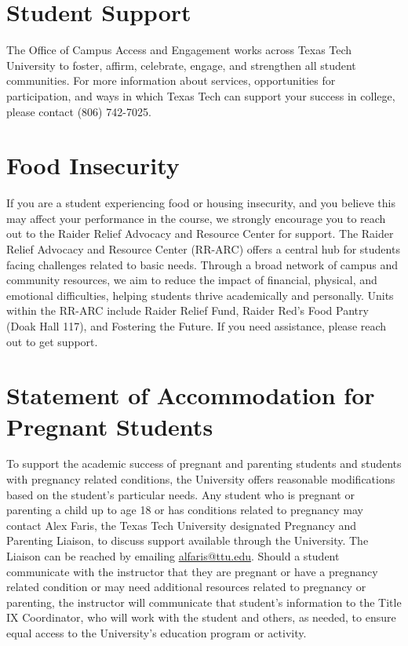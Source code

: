 \documentclass[12pt, notitlepage]{article}   	%
\begin{document}
{\section{Student Support}
The Office of Campus Access and Engagement works across Texas Tech University to foster, affirm, celebrate, engage, and strengthen all student communities. For more information about services, opportunities for participation, and ways in which Texas Tech can support your success in college, please contact (806) 742-7025.

\section{Food Insecurity}
If you are a student experiencing food or housing insecurity, and you believe this may affect your performance in the course, we strongly encourage you to reach out to the Raider Relief Advocacy and Resource Center for support. The Raider Relief Advocacy and Resource Center (RR-ARC) offers a central hub for students facing challenges related to basic needs. Through a broad network of campus and community resources, we aim to reduce the impact of financial, physical, and emotional difficulties, helping students thrive academically and personally. Units within the RR-ARC include Raider Relief Fund, Raider Red's Food Pantry (Doak Hall 117), and Fostering the Future. If you need assistance, please reach out to get support.

\section{Statement of Accommodation for Pregnant Students}
To support the academic success of pregnant and parenting students and students with pregnancy related conditions, the University offers reasonable modifications based on the student’s particular needs. Any student who is pregnant or parenting a child up to age 18 or has conditions related to pregnancy may contact Alex Faris, the Texas Tech University designated Pregnancy and Parenting Liaison, to discuss support available through the University. The Liaison can be reached by emailing \href{mailto:alfaris@ttu.edu}{alfaris@ttu.edu}. Should a student communicate with the instructor that they are pregnant or have a pregnancy related condition or may need additional resources related to pregnancy or parenting, the instructor will communicate that student’s information to the Title IX Coordinator, who will work with the student and others, as needed, to ensure equal access to the University’s education program or activity. 

}
\end{document}
